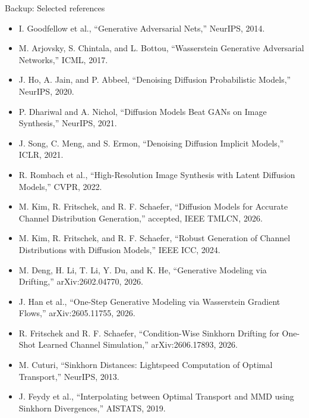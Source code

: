 \documentclass[english,xcolor=dvipsnames,aspectratio=169,10pt]{beamer}
\begin{document}
\begin{frame}{Backup: Selected references}
\scriptsize
\begin{itemize}\setlength\itemsep{0.35em}
\item I. Goodfellow et al., ``Generative Adversarial Nets,'' NeurIPS, 2014.
\item M. Arjovsky, S. Chintala, and L. Bottou, ``Wasserstein Generative Adversarial Networks,'' ICML, 2017.
\item J. Ho, A. Jain, and P. Abbeel, ``Denoising Diffusion Probabilistic Models,'' NeurIPS, 2020.
\item P. Dhariwal and A. Nichol, ``Diffusion Models Beat GANs on Image Synthesis,'' NeurIPS, 2021.
\item J. Song, C. Meng, and S. Ermon, ``Denoising Diffusion Implicit Models,'' ICLR, 2021.
\item R. Rombach et al., ``High-Resolution Image Synthesis with Latent Diffusion Models,'' CVPR, 2022.
\item M. Kim, R. Fritschek, and R. F. Schaefer, ``Diffusion Models for Accurate Channel Distribution Generation,'' accepted, IEEE TMLCN, 2026.
\item M. Kim, R. Fritschek, and R. F. Schaefer, ``Robust Generation of Channel Distributions with Diffusion Models,'' IEEE ICC, 2024.
\item M. Deng, H. Li, T. Li, Y. Du, and K. He, ``Generative Modeling via Drifting,'' arXiv:2602.04770, 2026.
\item J. Han et al., ``One-Step Generative Modeling via Wasserstein Gradient Flows,'' arXiv:2605.11755, 2026.
\item R. Fritschek and R. F. Schaefer, ``Condition-Wise Sinkhorn Drifting for One-Shot Learned Channel Simulation,'' arXiv:2606.17893, 2026.
\item M. Cuturi, ``Sinkhorn Distances: Lightspeed Computation of Optimal Transport,'' NeurIPS, 2013.
\item J. Feydy et al., ``Interpolating between Optimal Transport and MMD using Sinkhorn Divergences,'' AISTATS, 2019.
\end{itemize}
\end{frame}
\end{document}
